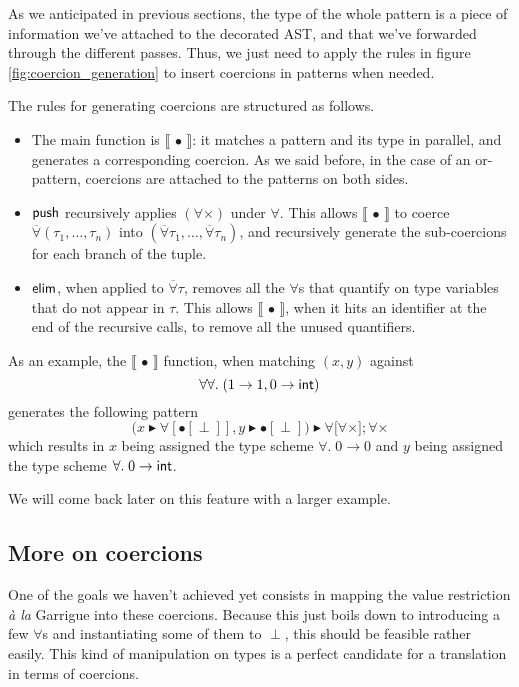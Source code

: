 \documentclass[10pt,a4paper,twoside,titlepage,twocolumn]{article}
\newcommand{\forallvec}{\ensuremath{\overline{\forall}}}
\begin{document}
As we anticipated in previous sections, the type of the whole pattern is a piece
of information we've attached to the decorated AST, and that we've forwarded
through the different passes. Thus, we just need to apply the rules in figure
\vref{fig:coercion_generation} to insert coercions in patterns when needed.

The rules for generating coercions are structured as follows.
\begin{itemize}
  \item The main function is $\llbracket\,\bullet\,\rrbracket$: it matches a
    pattern and its type in parallel, and generates a corresponding coercion. As
    we said before, in the case of an or-pattern, coercions are attached to the
    patterns on both sides.
  \item $\text{\textsf{push}}$ recursively applies $(\forall\times)$ under $\forall$. This
    allows $\llbracket\,\bullet\,\rrbracket$ to coerce $\forallvec (\tau_1,
    \dots, \tau_n)$ into $(\forallvec \tau_1, \dots, \forallvec \tau_n)$, and
    recursively generate the sub-coercions for each branch of the tuple.
  \item $\text{\textsf{elim}}$, when applied to $\forallvec\tau$, removes all the
    $\forall$s that quantify on type variables that do not appear in $\tau$.
    This allows $\llbracket\,\bullet\,\rrbracket$, when it hits an identifier at
    the end of the recursive calls, to remove all the unused quantifiers.
\end{itemize}

As an example, the $\llbracket\,\bullet\,\rrbracket$ function, when matching
$(x, y)$ against $$\forall\forall.\; (1 \to 1, 0 \to \text{\textsf{int}})$$
generates the following pattern
$$\big(x \blacktriangleright \forall[\bullet[\perp]],
   y \blacktriangleright \bullet[\perp]\big)
\blacktriangleright \forall\big[\forall\times\big]; \forall\times$$
which results in $x$ being assigned the type scheme $\forall.\; 0 \to 0$ and $y$
being assigned the type scheme $\forall.\; 0 \to \text{\textsf{int}}$.

We will come back later on this feature with a larger example.

\subsection{More on coercions}

One of the goals we haven't achieved yet consists in mapping the value
restriction \emph{à la} Garrigue into these coercions. Because this just boils
down to introducing a few $\forall$s and instantiating some of them to $\perp$,
this should be feasible rather easily. This kind of manipulation on types is
a perfect candidate for a translation in terms of coercions.
\end{document}
